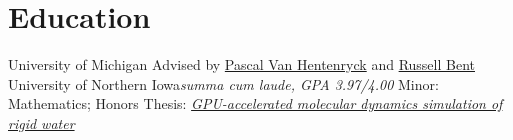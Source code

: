 \section{Education}
		{University of Michigan}{}{}
		{Advised by \href{http://pascalvanhentenryck.engin.umich.edu/}{Pascal Van Hentenryck} and \href{http://public.lanl.gov/rbent/}{Russell Bent}}
		{University of Northern Iowa}{}{\textit{summa cum laude, GPA 3.97/4.00}}
		{Minor: Mathematics; Honors Thesis: \href{http://www.tasseff.com/documents/reports/2012-gpu_accelerated_molecular_dynamics_simulation_of_rigid_water.pdf}{\textit{GPU-accelerated molecular dynamics simulation of rigid water}}}
